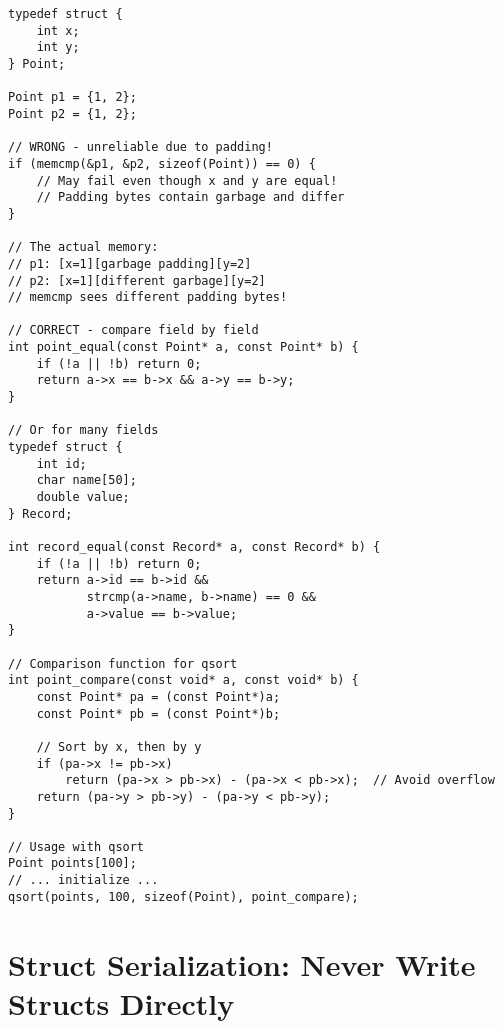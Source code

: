 \begin{lstlisting}
typedef struct {
    int x;
    int y;
} Point;

Point p1 = {1, 2};
Point p2 = {1, 2};

// WRONG - unreliable due to padding!
if (memcmp(&p1, &p2, sizeof(Point)) == 0) {
    // May fail even though x and y are equal!
    // Padding bytes contain garbage and differ
}

// The actual memory:
// p1: [x=1][garbage padding][y=2]
// p2: [x=1][different garbage][y=2]
// memcmp sees different padding bytes!

// CORRECT - compare field by field
int point_equal(const Point* a, const Point* b) {
    if (!a || !b) return 0;
    return a->x == b->x && a->y == b->y;
}

// Or for many fields
typedef struct {
    int id;
    char name[50];
    double value;
} Record;

int record_equal(const Record* a, const Record* b) {
    if (!a || !b) return 0;
    return a->id == b->id &&
           strcmp(a->name, b->name) == 0 &&
           a->value == b->value;
}

// Comparison function for qsort
int point_compare(const void* a, const void* b) {
    const Point* pa = (const Point*)a;
    const Point* pb = (const Point*)b;

    // Sort by x, then by y
    if (pa->x != pb->x)
        return (pa->x > pb->x) - (pa->x < pb->x);  // Avoid overflow
    return (pa->y > pb->y) - (pa->y < pb->y);
}

// Usage with qsort
Point points[100];
// ... initialize ...
qsort(points, 100, sizeof(Point), point_compare);
\end{lstlisting}

\section{Struct Serialization: Never Write Structs Directly}

